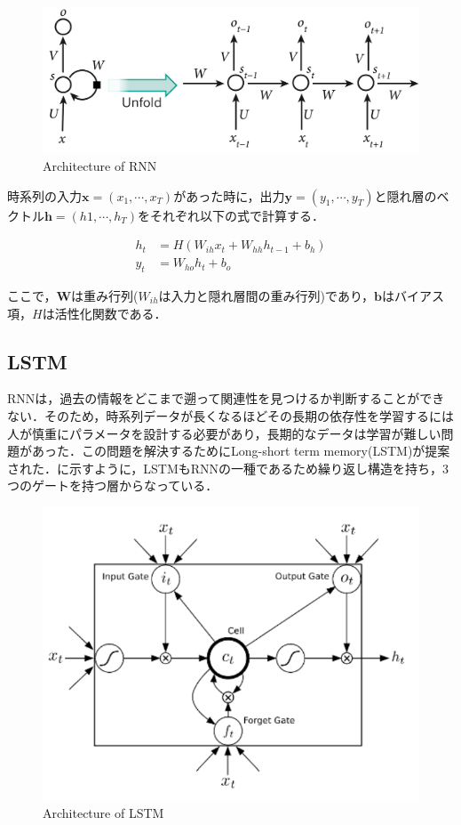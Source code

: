 \begin{figure}[H]
	\centering
	\includegraphics[width=0.7\linewidth]{fig/simpleRNN}
	\caption{Architecture of RNN\cite{simpleRNN}}
	\label{fig:simpleRNN}
\end{figure}


時系列の入力$\bm{x} = (x_1, \cdots , x_T)$があった時に，出力$\bm{y} = (y_1, \cdots , y_T)$と隠れ層のベクトル$\bm{h} = (h1, \cdots ,h_T)$をそれぞれ以下の式で計算する．

\begin{align}\label{eq:RNN}
	h_t & = H(W_{ih} x_t + W_{hh} h_{t-1} + b_h) \\ 
	y_t & = W_{ho} h_t + b_o
\end{align}

ここで，$\bm{W}$は重み行列($W_{ih}$は入力と隠れ層間の重み行列)であり，$\bm{b}$はバイアス項，$H$は活性化関数である．

\subsection*{LSTM}
RNNは，過去の情報をどこまで遡って関連性を見つけるか判断することができない．そのため，時系列データが長くなるほどその長期の依存性を学習するには人が慎重にパラメータを設計する必要があり，長期的なデータは学習が難しい問題があった．この問題を解決するためにLong-short term memory(LSTM)が提案された．に示すように，LSTMもRNNの一種であるため繰り返し構造を持ち，3つのゲートを持つ層からなっている．

\begin{figure}[h]
	\centering
	\includegraphics[width=0.7\linewidth]{fig/lstm.png}
	\caption{Architecture of LSTM}
	\label{fig:LSTM}
\end{figure}

